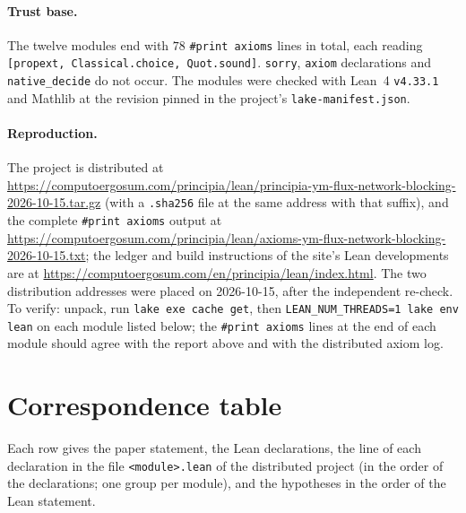 \documentclass[11pt,a4paper]{article}
\theoremstyle{definition}
\theoremstyle{remark}
\newcommand{\code}[1]{\texttt{#1}}
\newcommand{\bundleurl}{https://computoergosum.com/principia/lean/principia-ym-flux-network-blocking-2026-10-15.tar.gz}
\newcommand{\axiomsurl}{https://computoergosum.com/principia/lean/axioms-ym-flux-network-blocking-2026-10-15.txt}
\begin{document}
\paragraph{Trust base.}
{\sloppy The twelve modules end with $78$ \code{\#print axioms} lines in total, each reading \code{[propext, Classical.choice, Quot.sound]}. \code{sorry}, \code{axiom} declarations and \code{native\_decide} do not occur. The modules were checked with Lean~4 \code{v4.33.1} and Mathlib at the revision pinned in the project's \code{lake-\allowbreak{}manifest.json}.\par}

\paragraph{Reproduction.}
{\sloppy The project is distributed at \url{\bundleurl} (with a \code{.sha256} file at the same address with that suffix), and the complete \code{\#print axioms} output at \url{\axiomsurl}; the ledger and build instructions of the site's Lean developments are at \url{https://computoergosum.com/en/principia/lean/index.html}. The two distribution addresses were placed on 2026-10-15, after the independent re-check.
To verify: unpack, run \code{lake exe cache get}, then \code{LEAN\_NUM\_THREADS=1 lake env lean} on each module listed below; the \code{\#print axioms} lines at the end of each module should agree with the report above and with the distributed axiom log.\par}

\section{Correspondence table}\label{sec:corr}
Each row gives the paper statement, the Lean declarations, the line of each declaration in the file \code{<module>.lean} of the distributed project (in the order of the declarations; one group per module), and the hypotheses in the order of the Lean statement.
\end{document}
